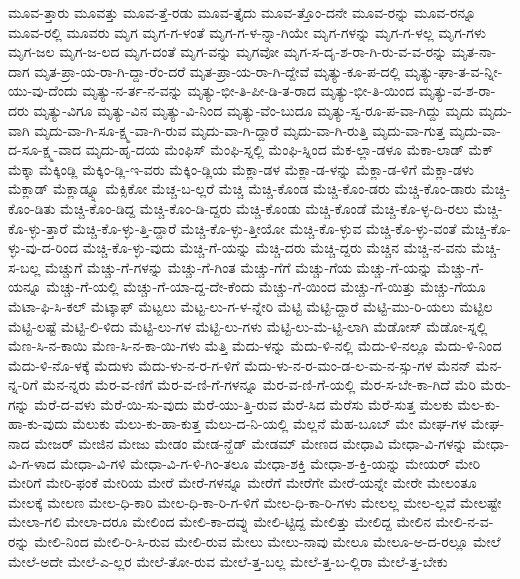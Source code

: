 {ಮೂವ-ತ್ತಾರು
ಮೂವತ್ತು
ಮೂವ-ತ್ತೆ-ರಡು
ಮೂವ-ತ್ತೈದು
ಮೂವ-ತ್ತೊಂ-ದನೇ
ಮೂವ-ರನ್ನು
ಮೂವ-ರನ್ನೂ
ಮೂವ-ರಲ್ಲಿ
ಮೂವರು
ಮೃಗ
ಮೃಗ-ಗ-ಳಂತೆ
ಮೃಗ-ಗ-ಳ-ನ್ನಾ-ಗಿಯೇ
ಮೃಗ-ಗಳನ್ನು
ಮೃಗ-ಗ-ಳಲ್ಲ
ಮೃಗ-ಗಳು
ಮೃಗ-ಜಲ
ಮೃಗ-ಜ-ಲದ
ಮೃಗ-ದಂತೆ
ಮೃಗ-ವನ್ನು
ಮೃಗವೋ
ಮೃಗ-ಸ-ದೃ-ಶ-ರಾ-ಗಿ-ರು-ವ-ವ-ರನ್ನು
ಮೃತ-ನಾ-ದಾಗ
ಮೃತ-ಪ್ರಾ-ಯ-ರಾ-ಗಿ-ದ್ದಾ-ರೆಂ-ದರೆ
ಮೃತ-ಪ್ರಾ-ಯ-ರಾ-ಗಿ-ದ್ದೇವೆ
ಮೃತ್ಯು-ಕೂ-ಪ-ದಲ್ಲಿ
ಮೃತ್ಯು-ಘಾ-ತ-ವ-ನ್ನೀ-ಯು-ವು-ದೆಂದು
ಮೃತ್ಯು-ನ-ರ್ತ-ನ-ವನ್ನು
ಮೃತ್ಯು-ಭೀ-ತಿ-ಪೀ-ಡಿ-ತ-ರಾದ
ಮೃತ್ಯು-ಭೀ-ತಿ-ಯಿಂದ
ಮೃತ್ಯು-ವ-ಶ-ರಾ-ದರು
ಮೃತ್ಯು-ವಿಗೂ
ಮೃತ್ಯು-ವಿನ
ಮೃತ್ಯು-ವಿ-ನಿಂದ
ಮೃತ್ಯು-ವೆಂ-ಬುದೂ
ಮೃತ್ಯು-ಸ್ವ-ರೂ-ಪ-ವಾ-ಗಿದ್ದು
ಮೃದು
ಮೃದು-ವಾಗಿ
ಮೃದು-ವಾ-ಗಿ-ಸೂ-ಕ್ಷ್ಮ-ವಾ-ಗಿ-ರುವ
ಮೃದು-ವಾ-ಗಿ-ದ್ದಾರೆ
ಮೃದು-ವಾ-ಗಿ-ರುತ್ತಿ
ಮೃದು-ವಾ-ಗುತ್ತ
ಮೃದು-ವಾ-ದ-ಸೂ-ಕ್ಷ್ಮ-ವಾದ
ಮೃದು-ಹೃ-ದಯ
ಮೆಂಫಿಸ್
ಮೆಂಫಿ-ಸ್ನಲ್ಲಿ
ಮೆಂಫಿ-ಸ್ನಿಂದ
ಮೆಕ-ಲ್ಲಾ-ಡಳೂ
ಮೆಕಾ-ಲಾಡ್
ಮೆಕ್
ಮೆಕ್ಕಾ
ಮೆಕ್ಕಿಂಡ್ಲಿ
ಮೆಕ್ಕಿಂ-ಡ್ಲಿ-ಇ-ವರು
ಮೆಕ್ಕಿಂ-ಡ್ಲಿಯ
ಮೆಕ್ಲಾ-ಡಳ
ಮೆಕ್ಲಾ-ಡ-ಳನ್ನು
ಮೆಕ್ಲಾ-ಡ-ಳಿಗೆ
ಮೆಕ್ಲಾ-ಡಳು
ಮೆಕ್ಲಾಡ್
ಮೆಕ್ಲಾಡ್ನ್ನೂ
ಮೆಕ್ಸಿಕೋ
ಮೆಚ್ಚ-ಬ-ಲ್ಲರೆ
ಮೆಚ್ಚಿ
ಮೆಚ್ಚಿ-ಕೊಂಡ
ಮೆಚ್ಚಿ-ಕೊಂ-ಡರು
ಮೆಚ್ಚಿ-ಕೊಂ-ಡಾರು
ಮೆಚ್ಚಿ-ಕೊಂ-ಡಿತು
ಮೆಚ್ಚಿ-ಕೊಂ-ಡಿದ್ದ
ಮೆಚ್ಚಿ-ಕೊಂ-ಡಿ-ದ್ದರು
ಮೆಚ್ಚಿ-ಕೊಂಡು
ಮೆಚ್ಚಿ-ಕೊಂಡೆ
ಮೆಚ್ಚಿ-ಕೊ-ಳ್ಳ-ದಿ-ರಲು
ಮೆಚ್ಚಿ-ಕೊ-ಳ್ಳು-ತ್ತಾರೆ
ಮೆಚ್ಚಿ-ಕೊ-ಳ್ಳು-ತ್ತಿ-ದ್ದಾರೆ
ಮೆಚ್ಚಿ-ಕೊ-ಳ್ಳು-ತ್ತೀಯೋ
ಮೆಚ್ಚಿ-ಕೊ-ಳ್ಳುವ
ಮೆಚ್ಚಿ-ಕೊ-ಳ್ಳು-ವಂತೆ
ಮೆಚ್ಚಿ-ಕೊ-ಳ್ಳು-ವು-ದ-ರಿಂದ
ಮೆಚ್ಚಿ-ಕೊ-ಳ್ಳು-ವುದು
ಮೆಚ್ಚಿ-ಗೆ-ಯನ್ನು
ಮೆಚ್ಚಿ-ದರು
ಮೆಚ್ಚಿ-ದ್ದರು
ಮೆಚ್ಚಿನ
ಮೆಚ್ಚಿ-ನ-ವನು
ಮೆಚ್ಚಿ-ಸ-ಬಲ್ಲ
ಮೆಚ್ಚುಗೆ
ಮೆಚ್ಚು-ಗೆ-ಗಳನ್ನು
ಮೆಚ್ಚು-ಗೆ-ಗಿಂತ
ಮೆಚ್ಚು-ಗೆಗೆ
ಮೆಚ್ಚು-ಗೆಯ
ಮೆಚ್ಚು-ಗೆ-ಯನ್ನು
ಮೆಚ್ಚು-ಗೆ-ಯನ್ನೂ
ಮೆಚ್ಚು-ಗೆ-ಯಲ್ಲಿ
ಮೆಚ್ಚು-ಗೆ-ಯಾ-ದ್ದ-ದೇ-ಕೆಂದು
ಮೆಚ್ಚು-ಗೆ-ಯಿಂದ
ಮೆಚ್ಚು-ಗೆ-ಯಿತ್ತು
ಮೆಚ್ಚು-ಗೆಯೂ
ಮೆಟಾ-ಫಿ-ಸಿ-ಕಲ್
ಮೆಟ್ಕಾಫ್
ಮೆಟ್ಟಲು
ಮೆಟ್ಟ-ಲು-ಗ-ಳ-ನ್ನೇರಿ
ಮೆಟ್ಟಿ
ಮೆಟ್ಟಿ-ದ್ದಾರೆ
ಮೆಟ್ಟಿ-ಮು-ರಿ-ಯಲು
ಮೆಟ್ಟಿಲ
ಮೆಟ್ಟಿ-ಲಷ್ಟೆ
ಮೆಟ್ಟಿ-ಲಿ-ಳಿದು
ಮೆಟ್ಟಿ-ಲು-ಗಳ
ಮೆಟ್ಟಿ-ಲು-ಗಳು
ಮೆಟ್ಟಿ-ಲು-ಮೆ-ಟ್ಟಿ-ಲಾಗಿ
ಮೆಡೋಸ್
ಮೆಡೋ-ಸ್ನಲ್ಲಿ
ಮೆಣ-ಸಿ-ನ-ಕಾಯಿ
ಮೆಣ-ಸಿ-ನ-ಕಾ-ಯಿ-ಗಳು
ಮೆತ್ತಿ
ಮೆದು-ಳನ್ನು
ಮೆದು-ಳಿ-ನಲ್ಲಿ
ಮೆದು-ಳಿ-ನಲ್ಲೂ
ಮೆದು-ಳಿ-ನಿಂದ
ಮೆದು-ಳಿ-ನೊ-ಳಕ್ಕೆ
ಮೆದುಳು
ಮೆದು-ಳು-ನ-ರ-ಗ-ಳಿಗೆ
ಮೆದು-ಳು-ನ-ರ-ಮಂ-ಡ-ಲ-ಮ-ನ-ಸ್ಸು-ಗಳ
ಮೆನನ್
ಮೆನ-ನ್ನ-ರಿಗೆ
ಮೆನ-ನ್ನರು
ಮೆರ-ವ-ಣಿಗೆ
ಮೆರ-ವ-ಣಿ-ಗೆ-ಗಳನ್ನೂ
ಮೆರ-ವ-ಣಿ-ಗೆ-ಯಲ್ಲಿ
ಮೆರ-ಸ-ಬೇ-ಕಾ-ಗಿದೆ
ಮೆರಿ
ಮೆರು-ಗನ್ನು
ಮೆರೆ-ದ-ವಳು
ಮೆರೆ-ಯಿ-ಸು-ವುದು
ಮೆರೆ-ಯು-ತ್ತಿ-ರುವ
ಮೆರೆ-ಸಿದ
ಮೆರೆಸು
ಮೆರೆ-ಸುತ್ತ
ಮೆಲಕು
ಮೆಲ-ಕು-ಹಾ-ಕು-ವುದು
ಮೆಲುಕು
ಮೆಲು-ಕು-ಹಾ-ಕುತ್ತ
ಮೆಲು-ದ-ನಿ-ಯಲ್ಲಿ
ಮೆಲ್ಲನೆ
ಮೆಹ-ಬೂಬ್
ಮೇ
ಮೇಘ-ಗಳ
ಮೇಘ-ನಾದ
ಮೇಜರ್
ಮೇಜಿನ
ಮೇಜು
ಮೇಡಂ
ಮೇಡ-ನ್ಹೆಡ್
ಮೇಡಮ್
ಮೇಣದ
ಮೇಧಾವಿ
ಮೇಧಾ-ವಿ-ಗಳನ್ನು
ಮೇಧಾ-ವಿ-ಗ-ಳಾದ
ಮೇಧಾ-ವಿ-ಗಳಿ
ಮೇಧಾ-ವಿ-ಗ-ಳಿ-ಗಿಂ-ತಲೂ
ಮೇಧಾ-ಶಕ್ತಿ
ಮೇಧಾ-ಶ-ಕ್ತಿ-ಯನ್ನು
ಮೇಯರ್
ಮೇರಿ
ಮೇರಿಗೆ
ಮೇರಿ-ಫಂಕೆ
ಮೇರಿಯ
ಮೇರೆ
ಮೇರೆ-ಗಳನ್ನೂ
ಮೇರೆಗೆ
ಮೇರೆಗೇ
ಮೇರೆ-ಯನ್ನೇ
ಮೇರೇ
ಮೇಲಂತೂ
ಮೇಲಕ್ಕೆ
ಮೇಲಣ
ಮೇಲ-ಧಿ-ಕಾರಿ
ಮೇಲ-ಧಿ-ಕಾ-ರಿ-ಗ-ಳಿಗೆ
ಮೇಲ-ಧಿ-ಕಾ-ರಿ-ಗಳು
ಮೇಲಲ್ಲ
ಮೇಲ-ಲ್ಲವೆ
ಮೇಲಷ್ಟೇ
ಮೇಲಾ-ಗಲಿ
ಮೇಲಾ-ದರೂ
ಮೇಲಿಂದ
ಮೇಲಿ-ಕಾ-ದವ್ನು
ಮೇಲಿ-ಟ್ಟಿದ್ದ
ಮೇಲಿತ್ತು
ಮೇಲಿದ್ದ
ಮೇಲಿನ
ಮೇಲಿ-ನ-ವ-ರನ್ನು
ಮೇಲಿ-ನಿಂದ
ಮೇಲಿ-ರಿ-ಸಿ-ರುವ
ಮೇಲಿ-ರುವ
ಮೇಲು
ಮೇಲು-ನಾವು
ಮೇಲೂ
ಮೇಲೂ-ಅ-ದ-ರಲ್ಲೂ
ಮೇಲೆ
ಮೇಲೆ-ಅದೇ
ಮೇಲೆ-ಎ-ಲ್ಲರ
ಮೇಲೆ-ತೋ-ರುವ
ಮೇಲೆ-ತ್ತ-ಬಲ್ಲ
ಮೇಲೆ-ತ್ತ-ಬ-ಲ್ಲಿರಾ
ಮೇಲೆ-ತ್ತ-ಬೇಕು
}
